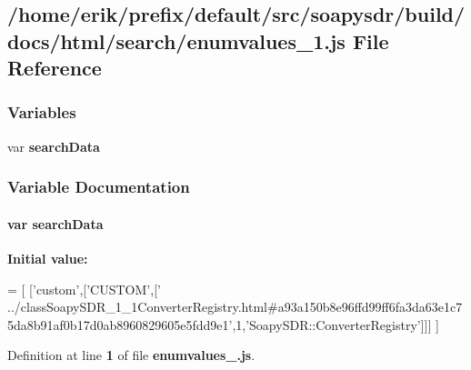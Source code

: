 \subsection{/home/erik/prefix/default/src/soapysdr/build/docs/html/search/enumvalues\+\_\+1.js File Reference}
\label{enumvalues__1_8js}
\subsubsection*{Variables}
\begin{DoxyCompactItemize}
\item 
var {\bf search\+Data}
\end{DoxyCompactItemize}


\subsubsection{Variable Documentation}
\paragraph[{search\+Data}]{\setlength{\rightskip}{0pt plus 5cm}var search\+Data}\label{enumvalues__1_8js_ad01a7523f103d6242ef9b0451861231e}
{\bfseries Initial value\+:}
\begin{DoxyCode}
=
[
  [\textcolor{stringliteral}{'custom'},[\textcolor{stringliteral}{'CUSTOM'},[\textcolor{stringliteral}{'
      ../classSoapySDR\_1\_1ConverterRegistry.html#a93a150b8e96ffd99ff6fa3da63e1c75da8b91af0b17d0ab8960829605e5fdd9e1'},1,\textcolor{stringliteral}{'SoapySDR::ConverterRegistry'}]]]
]
\end{DoxyCode}


Definition at line {\bf 1} of file {\bf enumvalues\+\_.\+js}.


